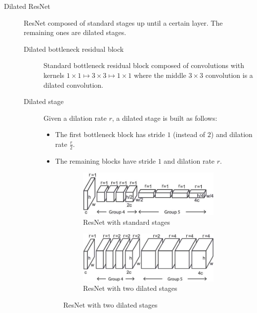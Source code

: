 \begin{description}
    \item[Dilated ResNet] 
        ResNet composed of standard stages up until a certain layer. The remaining ones are dilated stages.

        \begin{description}
            \item[Dilated bottleneck residual block]
                Standard bottleneck residual block composed of convolutions with kernels $1 \times 1 \mapsto 3 \times 3 \mapsto 1 \times 1$ where the middle $3 \times 3$ convolution is a dilated convolution.

            \item[Dilated stage]
                Given a dilation rate $r$, a dilated stage is built as follows:
                \begin{itemize}
                    \item The first bottleneck block has stride $1$ (instead of $2$) and dilation rate $\frac{r}{2}$.
                    \item The remaining blocks have stride $1$ and dilation rate $r$.
                \end{itemize}

                \begin{figure}[H]
                    \centering
                    \begin{subfigure}{0.45\linewidth}
                        \centering
                        \includegraphics[width=0.9\linewidth]{./img/_dilated_resnet_stage1.jpg}
                        \caption{ResNet with standard stages}
                    \end{subfigure}
                    \begin{subfigure}{0.45\linewidth}
                        \centering
                        \includegraphics[width=0.9\linewidth]{./img/_dilated_resnet_stage2.jpg}
                        \caption{ResNet with two dilated stages}
                    \end{subfigure}
                \end{figure}
        \end{description}


\end{description}

